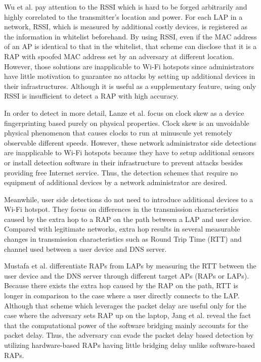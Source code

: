 \documentclass[conference]{IEEEtran}
\begin{document}
Wu et al. \cite{prapd} pay attention to the RSSI which is hard to be forged arbitrarily and highly correlated to the transmitter's location and power.
For each LAP in a network, RSSI, which is measured by additional costly devices, is registered as the information in whitelist beforehand.
By using RSSI, even if the MAC address of an AP is identical to that in the whitelist, that scheme can disclose that it is a RAP with spoofed MAC address set by an adversary at different location.
However, those solutions are inapplicable to Wi-Fi hotspots since administrators have little motivation to guarantee no attacks by setting up additional devices in their infrastructures.
Although it is useful as a supplementary feature, using only RSSI is insufficient to detect a RAP with high accuracy.

In order to detect in more detail, Lanze et al. \cite{clockskew} focus on clock skew as a device fingerprinting based purely on physical properties.
Clock skew is an unvoidable physical phenomenon that causes clocks to run at minuscule yet remotely observable different speeds.
However, these network administrator side detections are inapplicable to Wi-Fi hotspots because they have to setup additional sensors or install detection software in their infrastructure to prevent attacks besides providing free Internet service.
Thus, the detection schemes that require no equipment of additional devices by a network administrator are desired.

Meanwhile, user side detections do not need to introduce additional devices to a Wi-Fi hotspot. 
They focus on differences in the transmission characteristics caused by the extra hop to a RAP on the path between a LAP and user device. 
Compared with legitimate networks, extra hop results in several measurable changes in transmission characteristics such as Round Trip Time (RTT) and channel used between a user device and DNS server.

Mustafa et al. \cite{rtt} differentiate RAPs from LAPs by measuring the RTT between the user device and the DNS server through different target APs (RAPs or LAPs).
Because there exists the extra hop caused by the RAP on the path, RTT is longer in comparison to the case where a user directly connects to the LAP.
Although that scheme which leverages the packet delay are useful only for the case where the adversary sets RAP up on the laptop, Jang et al. \cite{previous} reveal the fact that the computational power of the software bridging mainly accounts for the packet delay.
Thus, the adversary can evade the packet delay based detection by utilizing hardware-based RAPs having little bridging delay unlike software-based RAPs.
\end{document}

